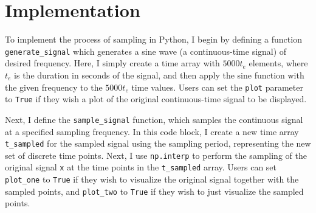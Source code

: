 \documentclass{article}
\begin{document}
\section{Implementation}


To implement the process of sampling in Python, I begin by defining a function \verb|generate_signal| which generates a sine wave (a continuous-time signal) of desired frequency.
Here, I simply create a time array with $5000t_e$ elements, where $t_e$ is the duration in seconds of the signal, 
and then apply the sine function with the given frequency to the $5000 t_e$ time values. 
Users can set the \verb|plot| parameter to \verb|True| if they wish a plot of the original continuous-time signal to be displayed.

Next, I define the \verb|sample_signal| function, which samples the continuous signal at a specified sampling frequency.
In this code block, I create a new time array \verb|t_sampled| for the sampled signal using the sampling period, representing the new set of discrete time points. 
Next, I use \verb|np.interp| to perform the sampling of the original signal \verb|x| at the time points in the \verb|t_sampled| array.
Users can set \verb|plot_one| to \verb|True| if they wish to visualize the original signal together with the sampled points, 
and \verb|plot_two| to \verb|True| if they wish to just visualize the sampled points.
\end{document}
